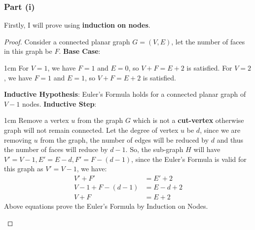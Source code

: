 \documentclass{article}
\let\bold\textbf
\newenvironment{myenv}{\begin{adjustwidth}{1cm}{}}{\end{adjustwidth}}
\begin{document}
{{    \subsubsection{Part (i)}{
      Firstly, I will prove using \bold{induction on nodes}.
      \begin{proof}
      Consider a connected planar graph $G=(V,E)$, let the number of faces in this graph be $F$. \newline
      \bold{Base Case}:
      \begin{myenv}
        For $V=1$, we have $F=1$ and $E=0$, so $V+F=E+2$ is satisfied. \newline
        For $V=2$, we have $F=1$ and $E=1$, so $V+F=E+2$ is satisfied.
      \end{myenv}
      \bold{Inductive Hypothesis}: Euler's Formula holds for a connected planar graph of   $V-1$ nodes. \newline
      \bold{Inductive Step}:
      \begin{myenv}
        Remove a vertex $u$ from the graph $G$ which is not a \bold{cut-vertex} otherwise graph will not remain connected. \newline
        Let the degree of vertex $u$ be $d$, since we are removing $u$ from the graph, the number of edges will be reduced by $d$ and thus the number of faces will reduce by $d-1$. \newline
        So, the sub-graph $H$ will have $V'=V-1,E'=E-d,F'=F-(d-1)$, since the Euler's Formula is valid for this graph as $V'=V-1$, we have:
        \begin{align*}
          V'+F'&=E'+2 \\
          V-1+F-(d-1)&=E-d+2 \\
          V+F&=E+2
        \end{align*}
        Above equations prove the Euler's Formula by Induction on Nodes.
      \end{myenv}
      \end{proof}
    }
    \newpage
}}
\end{document}
